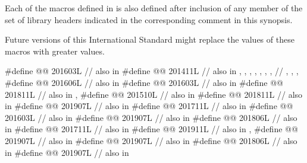 \pnum
Each of the macros defined in  is also defined
after inclusion of any member of the set of library headers
indicated in the corresponding comment in this synopsis.
\begin{note}
Future versions of this International Standard might replace
the values of these macros with greater values.
\end{note}

\begin{codeblock}
#define @@               201603L // also in 
#define @@  201411L
  // also in , , , , , , ,
  // , , , 
#define @@                               201606L // also in 
#define @@                             201603L // also in 
#define @@                   201811L // also in , 
#define @@                          201510L // also in 
#define @@                    201811L // also in 
#define @@                  201907L // also in 
#define @@                      201711L // also in 
#define @@        201603L // also in 
#define @@     201907L // also in 
#define @@                        201806L // also in 
#define @@                 201711L // also in 
#define @@       201911L // also in , 
#define @@                       201907L // also in 
#define @@                           201907L // also in 
#define @@                          201806L // also in 
#define @@                        201907L // also in 

\end{codeblock}
